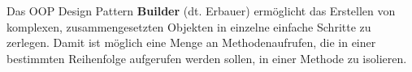 Das OOP Design Pattern \textbf{Builder} (dt. Erbauer) ermöglicht das Erstellen von komplexen, zusammengesetzten Objekten in einzelne einfache Schritte zu zerlegen.
Damit ist möglich eine Menge an Methodenaufrufen, die 
in einer bestimmten Reihenfolge aufgerufen werden sollen, 
in einer Methode zu isolieren. 